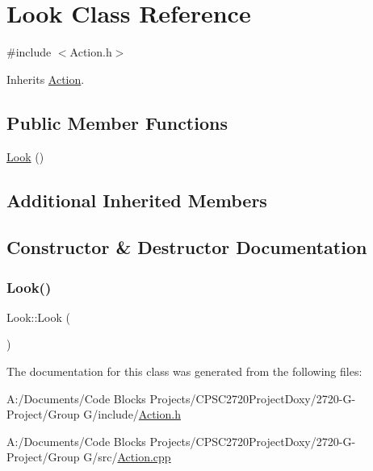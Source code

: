 \hypertarget{class_look}{}\section{Look Class Reference}
\label{class_look}


{\ttfamily \#include $<$Action.\+h$>$}



Inherits \mbox{\hyperlink{class_action}{Action}}.

\subsection*{Public Member Functions}
\begin{DoxyCompactItemize}
\item 
\mbox{\hyperlink{class_look_a065761a18a90519a51c71d2a6594f573}{Look}} ()
\end{DoxyCompactItemize}
\subsection*{Additional Inherited Members}


\subsection{Constructor \& Destructor Documentation}
\mbox{\label{class_look_a065761a18a90519a51c71d2a6594f573}} 
\subsubsection{\texorpdfstring{Look()}{Look()}}
{\footnotesize\ttfamily Look\+::\+Look (\begin{DoxyParamCaption}{ }\end{DoxyParamCaption})}



The documentation for this class was generated from the following files\+:\begin{DoxyCompactItemize}
\item 
A\+:/\+Documents/\+Code Blocks Projects/\+C\+P\+S\+C2720\+Project\+Doxy/2720-\/\+G-\/\+Project/\+Group G/include/\mbox{\hyperlink{_action_8h}{Action.\+h}}\item 
A\+:/\+Documents/\+Code Blocks Projects/\+C\+P\+S\+C2720\+Project\+Doxy/2720-\/\+G-\/\+Project/\+Group G/src/\mbox{\hyperlink{_action_8cpp}{Action.\+cpp}}\end{DoxyCompactItemize}
